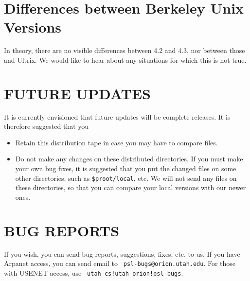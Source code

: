 \section{Differences between Berkeley Unix Versions}

In theory, there are no visible differences between 4.2 and 4.3, nor
between those and Ultrix.  We would like to hear about any situations
for which this is not true.

\section{FUTURE UPDATES}

It is currently envisioned that future updates will be complete
releases.  It is therefore suggested that you

\begin{itemize}

\item Retain this distribution tape in case you may have to compare files.

\item Do not make any changes on these distributed directories. If you must
make your own bug fixes, it is suggested that you put the changed
files on some other directories, such as {\tt \$proot/local}, etc.  We
will not send any files on these directories, so that you can compare
your local versions with our newer ones.

\end{itemize}

\section{BUG REPORTS}

If you wish, you can send bug reports, suggestions, fixes, etc. to us.
If you have Arpanet access, you can send email to {\tt
psl-bugs@orion.utah.edu}.  For those with USENET access, use {\tt
utah-cs!utah-orion!psl-bugs}.


